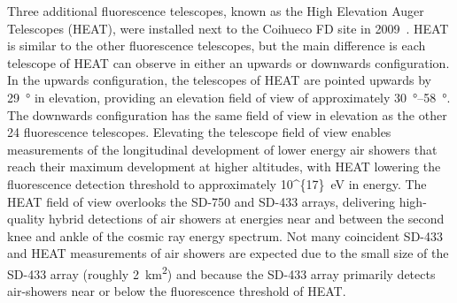 Three additional fluorescence telescopes, known as the High Elevation Auger Telescopes (HEAT), were installed next to the Coihueco FD site in 2009~\cite{auger_ecrs2010_heat}.
HEAT is similar to the other fluorescence telescopes, but the main difference is each telescope of HEAT can observe in either an upwards or downwards configuration.
In the upwards configuration, the telescopes of HEAT are pointed upwards by \qty{29}{\degree} in elevation, providing an elevation field of view of approximately \qtyrange{30}{58}{\degree}.
The downwards configuration has the same field of view in elevation as the other 24 fluorescence telescopes.
Elevating the telescope field of view enables measurements of the longitudinal development of lower energy air showers that reach their maximum development at higher altitudes, with HEAT lowering the fluorescence detection threshold to approximately \qty[parse-numbers=false]{10^{17}}{\electronvolt} in energy.
The HEAT field of view overlooks the SD-750 and SD-433 arrays, delivering high-quality hybrid detections of air showers at energies near and between the second knee and ankle of the cosmic ray energy spectrum.
Not many coincident SD-433 and HEAT measurements of air showers are expected due to the small size of the SD-433 array (roughly \qty{2}{\kilo\meter^{2}}) and because the SD-433 array primarily detects air-showers near or below the fluorescence threshold of HEAT.




















